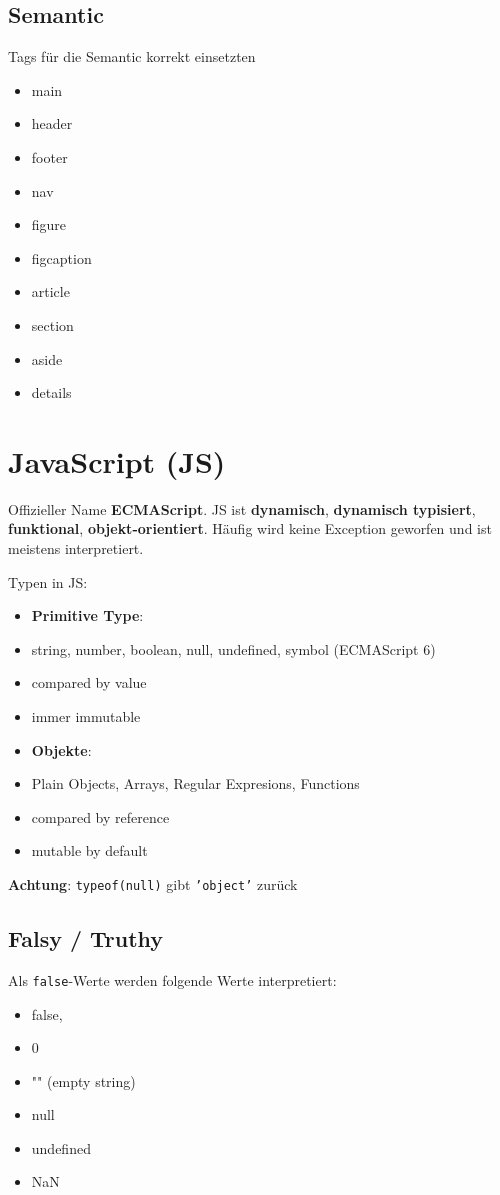 \documentclass[11pt,twoside,landscape]{article}
\begin{document}
\begin{multicols}{4}
\subsection*{Semantic}
\label{sec:org6cedca4}
Tags für die Semantic korrekt einsetzten
\begin{itemize}
\item main
\item header
\item footer
\item nav
\item figure
\item figcaption
\item article
\item section
\item aside
\item details
\end{itemize}

\section*{JavaScript (JS)}
\label{sec:org7a1f731}
Offizieller Name \textbf{ECMAScript}. JS ist \textbf{dynamisch},  \textbf{dynamisch typisiert}, \textbf{funktional}, \textbf{objekt-orientiert}. Häufig wird keine Exception geworfen und ist meistens interpretiert. 

Typen in JS:
\begin{itemize}
\item \textbf{Primitive Type}:
\item string, number, boolean, null, undefined, symbol (ECMAScript 6)
\item compared by value
\item immer immutable

\item \textbf{Objekte}:
\item Plain Objects, Arrays, Regular Expresions, Functions
\item compared by reference
\item mutable by default
\end{itemize}


\textbf{Achtung}: \texttt{typeof(null)} gibt \texttt{'object'} zurück

\subsection*{Falsy / Truthy}
\label{sec:org3935f94}
Als \texttt{false}-Werte werden folgende Werte interpretiert:
\begin{itemize}
\item false,
\item 0
\item "" (empty string)
\item null
\item undefined
\item NaN
\end{itemize}


\end{multicols}
\end{document}
